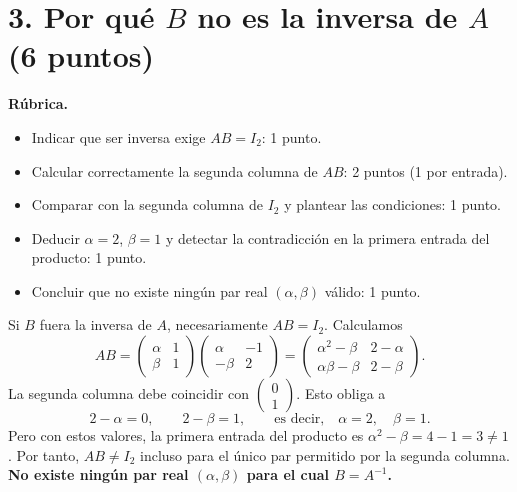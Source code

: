 \documentclass[10pt,a4]{examenEPN0}
\begin{document}
\section*{3. Por qué $B$ no es la inversa de $A$ (6 puntos)}
\noindent\textbf{Rúbrica.}
\begin{itemize}[itemsep=2pt]
    \item Indicar que ser inversa exige $AB=I_2$: 1 punto.
    \item Calcular correctamente la segunda columna de $AB$: 2 puntos
          (1 por entrada).
    \item Comparar con la segunda columna de $I_2$ y plantear las condiciones: 1 punto.
    \item Deducir $\alpha=2$, $\beta=1$ y detectar la contradicción
          en la primera entrada del producto: 1 punto.
    \item Concluir que no existe ningún par real $(\alpha,\beta)$ válido: 1 punto.
\end{itemize}
Si $B$ fuera la inversa de $A$, necesariamente $AB=I_2$. Calculamos
\[
    AB=\begin{pmatrix}\alpha&1\\\beta&1\end{pmatrix}
    \begin{pmatrix}\alpha&-1\\-\beta&2\end{pmatrix}
    =\begin{pmatrix}\alpha^2-\beta&2-\alpha\\
        \alpha\beta-\beta&2-\beta\end{pmatrix}.
\]
La segunda columna debe coincidir con $\begin{pmatrix}0\\1\end{pmatrix}$.
Esto obliga a
\[
    2-\alpha=0,\qquad 2-\beta=1,
    \qquad\text{es decir,}\quad \alpha=2,\quad\beta=1.
\]
Pero con estos valores, la primera entrada del producto es
$\alpha^2-\beta=4-1=3\ne1$. Por tanto, $AB\ne I_2$ incluso para el
único par permitido por la segunda columna.
\textbf{No existe ningún par real $(\alpha,\beta)$ para el cual $B=A^{-1}$.}
\end{document}
